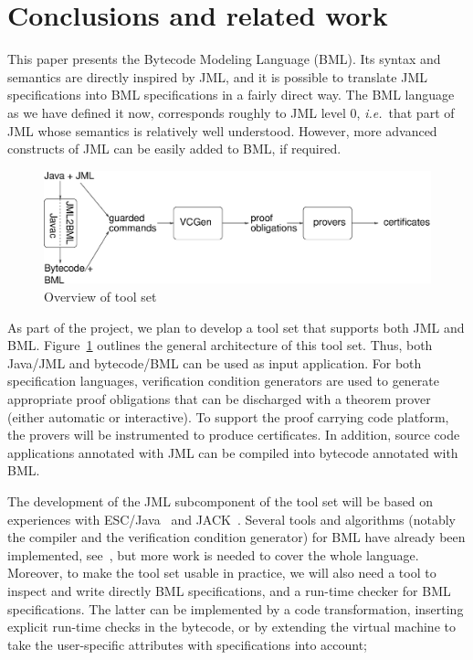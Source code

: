 \section{Conclusions and related work}\label{SecConcl}

This paper presents the Bytecode Modeling Language (BML). Its syntax
and semantics are directly inspired by JML, and it is possible to
translate JML specifications into BML specifications in a fairly
direct way. The BML language as we have defined it now, corresponds
roughly to JML level 0, \emph{i.e.}\ that part of JML whose semantics
is relatively well understood. However, more advanced constructs of
JML can be easily added to BML, if required. 

\begin{figure}[t]
\includegraphics[width=\textwidth]{toolset.eps} 
\caption{Overview of \mobius tool set}\label{FigToolSet}
\end{figure}
As part of the \mobius project, we plan to develop a tool set that
supports both JML and BML. Figure~\ref{FigToolSet} outlines the
general architecture of this tool set. Thus, both Java/JML and
bytecode/BML can be used as input application. For both specification
languages, verification condition generators are used to generate
appropriate proof obligations that can be discharged with a theorem
prover (either automatic or interactive). To support the proof
carrying code platform, the provers will be instrumented to produce
certificates. In addition, source code applications annotated with JML
can be compiled into bytecode annotated with BML.

The development of the JML subcomponent of the tool set will be based
on experiences with ESC/Java~\cite{CokK04} and JACK~\cite{BurdyRL03}.
Several tools and algorithms (notably the compiler and the
verification condition generator) for BML have already been
implemented, see~\cite{BurdyP06}, but more work is needed to cover the
whole language. Moreover, to make the tool set usable in practice, we
will also need a tool to inspect and write directly BML
specifications, and a run-time checker for BML specifications. The
latter can be implemented by a code transformation, inserting explicit
run-time checks in the bytecode, or by extending the virtual machine
to take the user-specific attributes with specifications into account;

